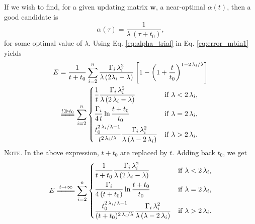 \documentclass[reprint]{revtex4-1}
\newcommand{\note}[1]{{\color{DarkGreen}\footnotesize \textsc{Note.} #1}}
\newcommand{\Err}{E}
\begin{document}
If we wish to find,
for a given updating matrix $\mathbf w$,
a near-optimal $\alpha(t)$,
%
then a good candidate is
%
\begin{equation}
\alpha(\tau) = \frac{1}{\lambda \, (\tau + t_0) },
\label{eq:alpha_trial}
\end{equation}
%
for some optimal value of $\lambda$.
%
Using Eq. \eqref{eq:alpha_trial}
in Eq. \eqref{eq:error_mbin1} yields
%
\begin{align}
\Err
&=
\frac{1}{t+t_0}
\sum_{i=2}^n
  \frac{       \Gamma_i \, \lambda_i^2      }
       { \lambda \, (2 \lambda_i - \lambda) }
\left[
  1 - \left(
        1 + \frac{ t }{ t_0 }
      \right)^{1 - 2 \, \lambda_i/\lambda}
\right]
\notag
\\
&\stackrel{      t \gg t_0      }
          { =\joinrel=\joinrel= }
%
\sum_{i = 2}^n
\begin{dcases}
  \frac{ 1 }
       { t }
  \frac{         \Gamma_i \, \lambda_i^2       }
       { \lambda \, (2 \, \lambda_i - \lambda) }
  &
  \mathrm{if \;} \lambda < 2 \, \lambda_i,
  \\%
  \frac{ \Gamma_i }
       {  4 \, t  }
  \ln \frac{ t + t_0 }
           {  t_0    }
  &
  \mathrm{if \;} \lambda = 2 \, \lambda_i,
  \\%
  \frac{ t_0^{ 2 \, \lambda_i / \lambda  - 1 } }
       {   t^{ 2 \, \lambda_i / \lambda      } }
  \frac{      \Gamma_i \, \lambda_i^2          }
       { \lambda \, (\lambda - 2 \, \lambda_i) }
  &
  \mathrm{if \;} \lambda > 2 \, \lambda_i.
\end{dcases}
\label{eq:y2_sum_perfect_invt}
\end{align}
%
\note{In the above expression,
$t + t_0$ are replaced by $t$.
%
Adding back $t_0$, we get
$$
\begin{aligned}
  \Err
  \stackrel{         t \to \infty         }
           { =\joinrel=\joinrel=\joinrel= }
  \sum_{i = 2}^n
  \begin{dcases}
    \frac{    1    }
         { t + t_0 }
    \frac{       \Gamma_i \, \lambda_i^2         }
         { \lambda \, (2 \, \lambda_i - \lambda) }
    &
    \mathrm{if \;} \lambda < 2 \, \lambda_i,
    \\%
    \frac{    \Gamma_i    }
         { 4 \, (t + t_0) }
    \ln \frac{ t + t_0 }
             {   t_0  }
    &
    \mathrm{if \;} \lambda = 2 \, \lambda_i,
    \\
    \frac{  t_0^{ 2 \, \lambda_i / \lambda  - 1}  }
         { (t + t_0)^{ 2 \, \lambda_i / \lambda } }
    \frac{      \Gamma_i \, \lambda_i^2          }
         { \lambda \, (\lambda - 2 \, \lambda_i) }
    &
    \mathrm{if \;} \lambda > 2 \, \lambda_i.
  \end{dcases}
\end{aligned}
$$
}
\end{document}
